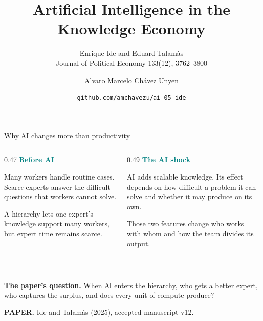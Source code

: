 \documentclass[aspectratio=169,11pt]{beamer}
\title{Artificial Intelligence in the\\Knowledge Economy}
\subtitle{Enrique Ide and Eduard Talam\`as\\
Journal of Political Economy 133(12), 3762--3800}
\author{Alvaro Marcelo Ch\'avez Unyen}
\date{\texttt{github.com/amchavezu/ai-05-ide}}
\newcommand{\key}[1]{\textcolor{Teal}{\textbf{#1}}}
\newcommand{\sourcefoot}{\scriptsize\color{Muted}\textbf{PAPER.} Ide and Talam\`as (2025), accepted manuscript v12.}
\begin{document}
{
\begin{frame}[plain]
  \vspace{0.65cm}
  {\color{Paper}\inserttitle\par}
  \vspace{0.40cm}
  {\color{Paper}\insertsubtitle\par}
  \vfill
  {\large\color{Paper}\insertauthor\par}
  \vspace{0.12cm}
  {\small\color{Paper}\insertdate\par}
  \vspace{0.45cm}
\end{frame}
}

\begin{frame}{Why AI changes more than productivity}
\small
\begin{columns}[T,totalwidth=\textwidth]
\begin{column}{0.47\textwidth}
  \key{Before AI}

  Many workers handle routine cases. Scarce experts answer the difficult
  questions that workers cannot solve.

  \vspace{0.24cm}
  A hierarchy lets one expert's knowledge support many workers, but expert
  time remains scarce.
\end{column}
\begin{column}{0.49\textwidth}
  \key{The AI shock}

  AI adds scalable knowledge. Its effect depends on how difficult a problem it
  can solve and whether it may produce on its own.

  \vspace{0.24cm}
  Those two features change who works with whom and how the team divides its
  output.
\end{column}
\end{columns}

\vfill
{\color{Coral}\rule{\textwidth}{0.8pt}}\\[-0.02cm]
\textbf{The paper's question.} When AI enters the hierarchy, who gets a better
expert, who captures the surplus, and does every unit of compute produce?

\vspace{0.08cm}
\sourcefoot
\end{frame}
\end{document}
